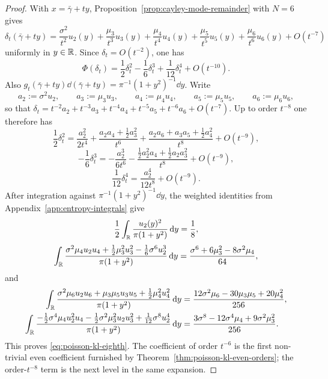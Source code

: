 \begin{proof}
With $x=\bar\gamma+ty$, Proposition~\ref{prop:cayley-mode-remainder} with
$N=6$ gives
\[
\delta_t(\bar\gamma+ty)
=\frac{\sigma^2}{t^2}u_2(y)
+\frac{\mu_3}{t^3}u_3(y)
+\frac{\mu_4}{t^4}u_4(y)
+\frac{\mu_5}{t^5}u_5(y)
+\frac{\mu_6}{t^6}u_6(y)
+O(t^{-7})
\]
uniformly in $y\in\mathbb{R}$.  Since $\delta_t=O(t^{-2})$, one has
\[
\Phi(\delta_t)
=\frac12\delta_t^2-\frac16\delta_t^3+\frac1{12}\delta_t^4+O(t^{-10}).
\]
Also $g_t(\bar\gamma+ty)\dd(\bar\gamma+ty)=\pi^{-1}(1+y^2)^{-1}\dd y$.
Write
\[
a_2:=\sigma^2u_2,\qquad a_3:=\mu_3u_3,\qquad a_4:=\mu_4u_4,
\qquad a_5:=\mu_5u_5,\qquad a_6:=\mu_6u_6,
\]
so that $\delta_t=t^{-2}a_2+t^{-3}a_3+t^{-4}a_4+t^{-5}a_5+t^{-6}a_6+O(t^{-7})$.
Up to order $t^{-8}$ one therefore has
\[
\frac12\delta_t^2
=\frac{a_2^2}{2t^4}
+\frac{a_2a_4+\frac12 a_3^2}{t^6}
+\frac{a_2a_6+a_3a_5+\frac12 a_4^2}{t^8}
+O(t^{-9}),
\]
\[
-\frac16\delta_t^3
=-\frac{a_2^3}{6t^6}
-\frac{\frac12 a_2^2a_4+\frac12 a_2a_3^2}{t^8}
+O(t^{-9}),
\]
\[
\frac1{12}\delta_t^4
=\frac{a_2^4}{12t^8}+O(t^{-9}).
\]
After integration against $\pi^{-1}(1+y^2)^{-1}\dd y$, the weighted
identities from Appendix~\ref{app:entropy-integrals} give
\[
\frac12\int_{\mathbb{R}}\frac{u_2(y)^2}{\pi(1+y^2)}\,\mathrm{d} y=\frac18,
\]
\[
\int_{\mathbb{R}}\frac{\sigma^2\mu_4u_2u_4+\frac12\mu_3^2u_3^2-\frac16\sigma^6u_2^3}
{\pi(1+y^2)}\,\mathrm{d} y
=\frac{\sigma^6+6\mu_3^2-8\sigma^2\mu_4}{64},
\]
and
\begin{align*}
\int_{\mathbb{R}}
\frac{\sigma^2\mu_6u_2u_6+\mu_3\mu_5u_3u_5+\frac12\mu_4^2u_4^2}
{\pi(1+y^2)}\,\mathrm{d} y
&=\frac{12\sigma^2\mu_6-30\mu_3\mu_5+20\mu_4^2}{256},
\\
\int_{\mathbb{R}}
\frac{-\frac12\sigma^4\mu_4u_2^2u_4-\frac12\sigma^2\mu_3^2u_2u_3^2
+\frac1{12}\sigma^8u_2^4}{\pi(1+y^2)}\,\mathrm{d} y
&=\frac{3\sigma^8-12\sigma^4\mu_4+9\sigma^2\mu_3^2}{256}.
\end{align*}
This proves \eqref{eq:poisson-kl-eighth}.  The coefficient of order
$t^{-6}$ is the first non-trivial even coefficient furnished by
Theorem~\ref{thm:poisson-kl-even-orders}; the order-$t^{-8}$ term is the
next level in the same expansion.
\end{proof}


